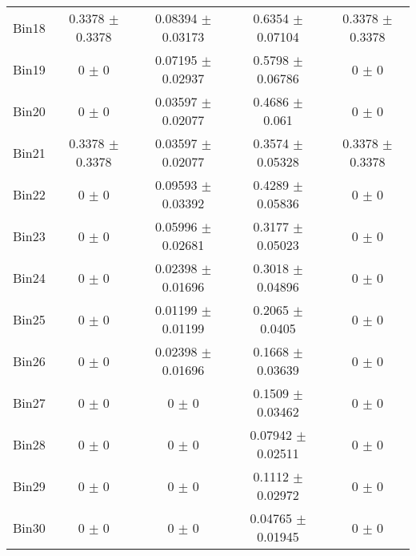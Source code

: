 \begin{tabular}{@{\extracolsep{4pt}}lcccc@{}}
     Bin18 & 0.3378 $\pm$ 0.3378 & 0.08394 $\pm$ 0.03173 & 0.6354 $\pm$ 0.07104 & 0.3378 $\pm$ 0.3378 \\ 
     Bin19 & 0 $\pm$ 0 & 0.07195 $\pm$ 0.02937 & 0.5798 $\pm$ 0.06786 & 0 $\pm$ 0 \\ 
     Bin20 & 0 $\pm$ 0 & 0.03597 $\pm$ 0.02077 & 0.4686 $\pm$ 0.061 & 0 $\pm$ 0 \\ 
     Bin21 & 0.3378 $\pm$ 0.3378 & 0.03597 $\pm$ 0.02077 & 0.3574 $\pm$ 0.05328 & 0.3378 $\pm$ 0.3378 \\ 
     Bin22 & 0 $\pm$ 0 & 0.09593 $\pm$ 0.03392 & 0.4289 $\pm$ 0.05836 & 0 $\pm$ 0 \\ 
     Bin23 & 0 $\pm$ 0 & 0.05996 $\pm$ 0.02681 & 0.3177 $\pm$ 0.05023 & 0 $\pm$ 0 \\ 
     Bin24 & 0 $\pm$ 0 & 0.02398 $\pm$ 0.01696 & 0.3018 $\pm$ 0.04896 & 0 $\pm$ 0 \\ 
     Bin25 & 0 $\pm$ 0 & 0.01199 $\pm$ 0.01199 & 0.2065 $\pm$ 0.0405 & 0 $\pm$ 0 \\ 
     Bin26 & 0 $\pm$ 0 & 0.02398 $\pm$ 0.01696 & 0.1668 $\pm$ 0.03639 & 0 $\pm$ 0 \\ 
     Bin27 & 0 $\pm$ 0 & 0 $\pm$ 0 & 0.1509 $\pm$ 0.03462 & 0 $\pm$ 0 \\ 
     Bin28 & 0 $\pm$ 0 & 0 $\pm$ 0 & 0.07942 $\pm$ 0.02511 & 0 $\pm$ 0 \\ 
     Bin29 & 0 $\pm$ 0 & 0 $\pm$ 0 & 0.1112 $\pm$ 0.02972 & 0 $\pm$ 0 \\ 
     Bin30 & 0 $\pm$ 0 & 0 $\pm$ 0 & 0.04765 $\pm$ 0.01945 & 0 $\pm$ 0 \\ 
\hline\hline
  \end{tabular}
